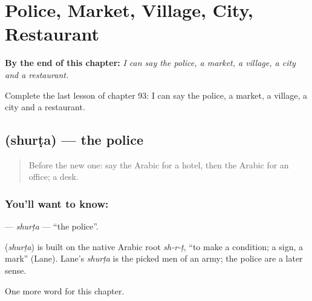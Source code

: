 
\chapter{Police, Market, Village, City, Restaurant}
\label{ch:ar-police-market-village-city-restaurant}

\begin{chapteropening}
\textbf{By the end of this chapter:} \emph{I can say the police, a market, a village, a city and a restaurant.}

Complete the last lesson of chapter 93: I can say the police, a market, a village, a city and a restaurant.
\end{chapteropening}

\section[\texorpdfstring{\ar{شرطة} (shurṭa)}{شرطة (shurṭa)}]{ (shurṭa) — the police}

\label{lesson:AR-C93-shurta}



\begin{quote}
Before the new one: say the Arabic for a hotel, then the Arabic for an office; a desk.
\end{quote}

\subsection*{You'll want to know: }
\textbf{} — \emph{shurṭa} — \textquotedblleft{}the police\textquotedblright{}.

\begin{cousinweb}
\textbf{} (\emph{shurṭa}) is built on the native Arabic root \emph{sh-r-ṭ}, \textquotedblleft{}to make a condition; a sign, a mark\textquotedblright{} (Lane). Lane's \emph{shurṭa} is the picked men of an army; the police are a later sense.
\end{cousinweb}

\begin{grammarlens}[title={What you've built}]
One more word for this chapter.
\end{grammarlens}

